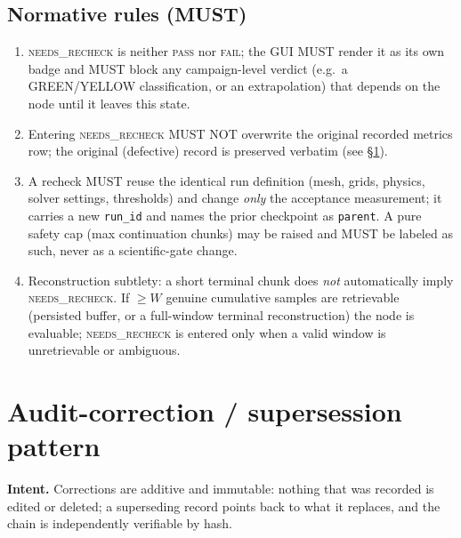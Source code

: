 \documentclass[11pt]{article}
\newcommand{\state}[1]{\textsc{#1}}
\newcommand{\code}[1]{\texttt{#1}}
\begin{document}
\subsection{Normative rules (MUST)}
\begin{enumerate}[leftmargin=1.6em]
\item \state{needs\_recheck} is neither \state{pass} nor \state{fail}; the GUI MUST render it as its own
badge and MUST block any campaign-level verdict (e.g.\ a GREEN/YELLOW classification, or an
extrapolation) that depends on the node until it leaves this state.
\item Entering \state{needs\_recheck} MUST NOT overwrite the original recorded metrics row; the original
(defective) record is preserved verbatim (see \S\ref{sec:supersede}).
\item A recheck MUST reuse the identical run definition (mesh, grids, physics, solver settings,
thresholds) and change \emph{only} the acceptance measurement; it carries a new \code{run\_id} and names
the prior checkpoint as \code{parent}. A pure safety cap (max continuation chunks) may be raised and MUST
be labeled as such, never as a scientific-gate change.
\item Reconstruction subtlety: a short terminal chunk does \emph{not} automatically imply
\state{needs\_recheck}. If $\ge W$ genuine cumulative samples are retrievable (persisted buffer, or a
full-window terminal reconstruction) the node is evaluable; \state{needs\_recheck} is entered only when a
valid window is unretrievable or ambiguous.
\end{enumerate}

\section{Audit-correction / supersession pattern}\label{sec:supersede}
\textbf{Intent.} Corrections are additive and immutable: nothing that was recorded is edited or deleted;
a superseding record points back to what it replaces, and the chain is independently verifiable by hash.
\end{document}
